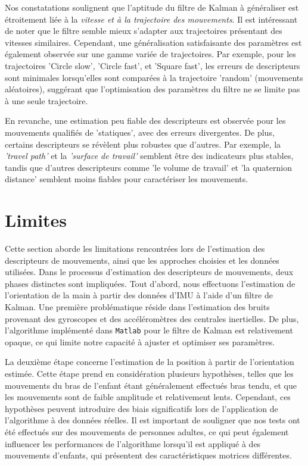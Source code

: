 \documentclass[5pt]{article}
\begin{document}
Nos constatations soulignent que l'aptitude du filtre de Kalman à généraliser est étroitement liée à la \textit{vitesse et à la trajectoire des mouvements}. Il est intéressant de noter que le filtre semble mieux s'adapter aux trajectoires présentant des vitesses similaires. Cependant, une généralisation satisfaisante des paramètres est également observée sur une gamme variée de trajectoires. Par exemple, pour les trajectoires 'Circle slow', 'Circle fast', et 'Square fast', les erreurs de descripteurs sont minimales lorsqu'elles sont comparées à la trajectoire 'random' (mouvements aléatoires), suggérant que l'optimisation des paramètres du filtre ne se limite pas à une seule trajectoire.

En revanche, une estimation peu fiable des descripteurs est observée pour les mouvements qualifiés de 'statiques', avec des erreurs divergentes. De plus, certains descripteurs se révèlent plus robustes que d'autres. Par exemple, la \textit{'travel path'} et la \textit{'surface de travail'} semblent être des indicateurs plus stables, tandis que d'autres descripteurs comme 'le volume de travail' et 'la quaternion distance' semblent moins fiables pour caractériser les mouvements.
                 
                         
\newpage
\section{Limites}
\label{limites}
Cette section aborde les limitations rencontrées lors de l'estimation des descripteurs de mouvements, ainsi que les approches choisies et les données utilisées. Dans le processus d'estimation des descripteurs de mouvements, deux phases distinctes sont impliquées. Tout d'abord, nous effectuons l'estimation de l'orientation de la main à partir des données d'IMU à l'aide d'un filtre de Kalman. Une première problématique réside dans l'estimation des bruits provenant des gyroscopes et des accéléromètres des centrales inertielles. De plus, l'algorithme implémenté dans \texttt{Matlab} pour le filtre de Kalman est relativement opaque, ce qui limite notre capacité à ajuster et optimiser ses paramètres.

La deuxième étape concerne l'estimation de la position à partir de l'orientation estimée. Cette étape prend en considération plusieurs hypothèses, telles que les mouvements du bras de l'enfant étant généralement effectués bras tendu, et que les mouvements sont de faible amplitude et relativement lents. Cependant, ces hypothèses peuvent introduire des biais significatifs lors de l'application de l'algorithme à des données réelles. Il est important de souligner que nos tests ont été effectués sur des mouvements de personnes adultes, ce qui peut également influencer les performances de l'algorithme lorsqu'il est appliqué à des mouvements d'enfants, qui présentent des caractéristiques motrices différentes. 
\newpage
\end{document}
